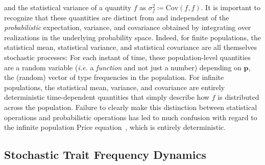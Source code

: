 and the statistical variance of a quantity $f$ as $\sigma^2_f \coloneqq \textrm{Cov}(f,f)$. It is important to recognize that these quantities are distinct from and independent of the \emph{probabilistic} expectation, variance, and covariance obtained by integrating over realizations in the underlying probability space. Indeed, for finite populations, the statistical mean, statistical variance, and statistical covariance are all themselves stochastic processes: For each instant of time, these population-level quantities are a random variable (\emph{i.e.} a \emph{function} and not just a number) depending on $\mathbf{p}$, the (random) vector of type frequencies in the population. For infinite populations, the statistical mean, variance, and covariance are entirely deterministic time-dependent quantities that simply describe how $f$ is distributed across the population. Failure to clearly make this distinction between statistical operations and probabilistic operations has led to much confusion with regard to the infinite population Price equation~\citep{van_veelen_use_2005}, which is entirely deterministic.

\subsection{Stochastic Trait Frequency Dynamics}

